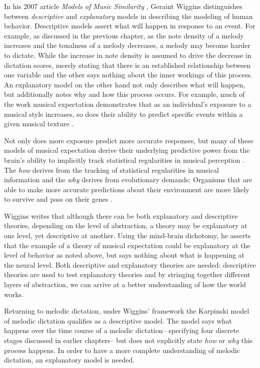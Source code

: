 \documentclass[]{book}
\begin{document}
In his 2007 article \emph{Models of Music Similarity} \citep{wigginsModelsMusicalSimilarity2007}, Geraint Wiggins distinguishes between \emph{descriptive} and \emph{explanatory} models in describing the modeling of human behavior.
Descriptive models assert what will happen in response to an event.
For example, as discussed in the previous chapter, as the note density of a melody increases and the tonalness of a melody decreases, a melody may become harder to dictate.
While the increase in note density is assumed to drive the decrease in dictation scores, merely stating that there is an established relationship between one variable and the other says nothing about the inner workings of this process.
An explanatory model on the other hand not only describes what will happen, but additionally notes why and how this process occurs.
For example, much of the work musical expectation demonstrates that as an individual's exposure to a musical style increases, so does their ability to predict specific events within a given musical texture \citep{pearceStatisticalLearningProbabilistic2018a}.

Not only does more exposure predict more accurate responses, but many of these models of musical expectation derive their underlying predictive power from the brain's ability to implicitly track statistical regularities in musical perception \citep{saffranStatisticalLearningTone1999, margulisRepeatHowMusic2014}.
The \emph{how} derives from the tracking of statistical regularities in musical information and the \emph{why} derives from evolutionary demands; Organisms that are able to make more accurate predictions about their environment are more likely to survive and pass on their genes \citep{huronSweetAnticipation2006}.

Wiggins writes that although there can be both explanatory and descriptive theories, depending on the level of abstraction, a theory may be explanatory at one level, yet descriptive at another.
Using the mind-brain dichotomy, he asserts that the example of a theory of musical expectation could be explanatory at the level of behavior as noted above, but says nothing about what is happening at the neural level.
Both descriptive and explanatory theories are needed: descriptive theories are used to test explanatory theories and by stringing together different layers of abstraction, we can arrive at a better understanding of how the world works.

Returning to melodic dictation, under Wiggins' framework the Karpinski model of melodic dictation \citep{karpinskiAuralSkillsAcquisition2000, karpinskiModelMusicPerception1990} qualifies as a descriptive model.
The model says what happens over the time course of a melodic dictation-- specifying four discrete stages discussed in earlier chapters-- but does not explicitly state \emph{how} or \emph{why} this process happens.
In order to have a more complete understanding of melodic dictation, an explanatory model is needed.
\end{document}
